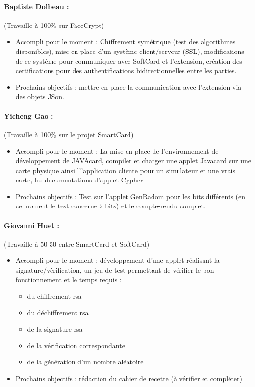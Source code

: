\documentclass[a4paper,10pt]{article}
\begin{document}
\paragraph{Baptiste Dolbeau :} (Travaille à 100\% sur FaceCrypt)
\begin{itemize}
\item Accompli pour le moment : Chiffrement symétrique (test des algorithmes
        disponibles), mise en place d'un système client/serveur (SSL), 
        modifications de ce système pour communiquer avec SoftCard et 
        l'extension, création des certifications pour des authentifications
        bidirectionnelles entre les parties.
\item Prochains objectifs : mettre en place la communication avec l'extension
        via des objets JSon. 
\end{itemize}

\paragraph{Yicheng Gao :} (Travaille à 100\% sur le projet SmartCard)
\begin{itemize}
    \item Accompli pour le moment : La mise en place de l'environnement de 
        développement de JAVAcard, compiler et charger une applet Javacard sur 
        une carte physique ainsi l'’application cliente pour un simulateur et 
        une vrais carte, les documentations d'applet Cypher
\item Prochains objectifs :  Test sur l'applet GenRadom pour les bits 
        différents (en ce moment le test concerne 2 bits) et le compte-rendu 
        complet.
\end{itemize}

\paragraph{Giovanni Huet : } (Travaille à 50-50 entre SmartCard et SoftCard) 
\begin{itemize}
    \item Accompli pour le moment : développement d'une applet réalisant la 
        signature/vérification, un jeu de test permettant de vérifier le bon 
        fonctionnement et le temps requis :
            \begin{itemize}
            \item du chiffrement rsa
            \item du déchiffrement rsa
            \item de la signature rsa
            \item de la vérification correspondante
            \item de la génération d'un nombre aléatoire
            \end{itemize}
\item Prochains objectifs : rédaction du cahier de recette (à vérifier et 
        compléter)
\end{itemize}
    
\end{document}
